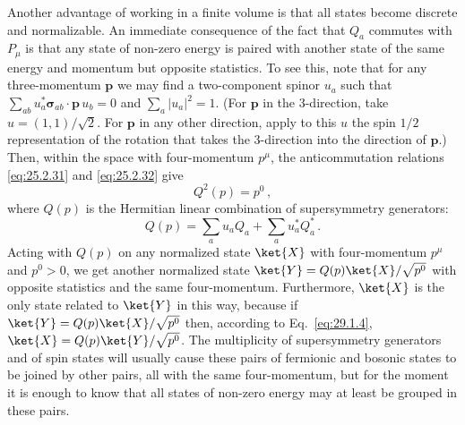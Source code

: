 Another advantage of working in a finite volume is that all states become
discrete and normalizable. An immediate consequence of the fact that
\(Q_a\) commutes with \(P_\mu\) is that any state of non-zero energy is
paired with another state of the same energy and momentum but opposite
statistics. To see this, note that for any three-momentum \(\mathbf p\) we
may find a two-component spinor \(u_a\) such that
\(\sum_{ab}u_a^*\boldsymbol{\sigma}_{ab}\mathbin{\cdot}\mathbf p\,u_b=0\)
and \(\sum_a\lvert u_a\rvert^2=1\). (For \(\mathbf p\) in the
3-direction, take \(u=(1,1)/\sqrt{2}\). For \(\mathbf p\) in any other
direction, apply to this \(u\) the spin \(1/2\) representation of the
rotation that takes the 3-direction into the direction of \(\mathbf p\).)
Then, within the space with four-momentum \(p^\mu\), the anticommutation
relations \eqref{eq:25.2.31} and \eqref{eq:25.2.32} give
\begin{equation}
  Q^2(p)=p^0\,,
  \tag{29.1.4}\label{eq:29.1.4}
\end{equation}
where \(Q(p)\) is the Hermitian linear combination of supersymmetry
generators:
\begin{equation}
  Q(p)=\sum_a u_aQ_a+\sum_a u_a^*Q_a^*\,.
  \tag{29.1.5}\label{eq:29.1.5}
\end{equation}
Acting with \(Q(p)\) on any normalized state \(\ket{X}\) with
four-momentum \(p^\mu\) and \(p^0>0\), we get another normalized state
\(\ket{Y}=Q(p)\ket{X}/\sqrt{p^0}\) with opposite statistics and the same
four-momentum. Furthermore, \(\ket{X}\) is the only state related to
\(\ket{Y}\) in this way, because if
\(\ket{Y}=Q(p)\ket{X}/\sqrt{p^0}\) then, according to
Eq.~\eqref{eq:29.1.4}, \(\ket{X}=Q(p)\ket{Y}/\sqrt{p^0}\). The
multiplicity of supersymmetry generators and of spin states will usually
cause these pairs of fermionic and bosonic states to be joined by other
pairs, all with the same four-momentum, but for the moment it is enough to
know that all states of non-zero energy may at least be grouped in these
pairs.

